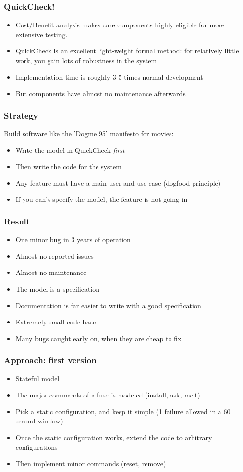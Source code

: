 \documentclass[lualatex]{beamer}
\begin{document}
\begin{frame}
  \frametitle{QuickCheck!}
  \begin{itemize}
  \item Cost/Benefit analysis makes core components highly eligible
    for more extensive testing.
  \item QuickCheck is an excellent light-weight formal method: for
    relatively little work, you gain lots of robustness in the system
  \item Implementation time is roughly 3-5 times normal development
  \item But components have almost no maintenance afterwards
  \end{itemize}
\end{frame}

\begin{frame}
  \frametitle{Strategy}
  Build software like the 'Dogme 95' manifesto for movies:
  \begin{itemize}
  \item Write the model in QuickCheck \emph{first}
  \item Then write the code for the system
  \item Any feature must have a main user and use case (dogfood
    principle)
  \item If you can't specify the model, the feature is not going in
  \end{itemize}
\end{frame}

\begin{frame}
  \frametitle{Result}
  \begin{itemize}
  \item One minor bug in 3 years of operation
  \item Almost no reported issues
  \item Almost no maintenance
  \item The model is a specification
  \item Documentation is far easier to write with a good specification
  \item Extremely small code base
  \item Many bugs caught early on, when they are cheap to fix
  \end{itemize}
\end{frame}

\begin{frame}
  \frametitle{Approach: first version}
  \begin{itemize}
  \item Stateful model
  \item The major commands of a fuse is modeled (install, ask, melt)
  \item Pick a static configuration, and keep it simple (1 failure
    allowed in a 60 second window)
  \item Once the static configuration works, extend the code to
    arbitrary configurations
  \item Then implement minor commands (reset, remove)
  \end{itemize}
\end{frame}
\end{document}
